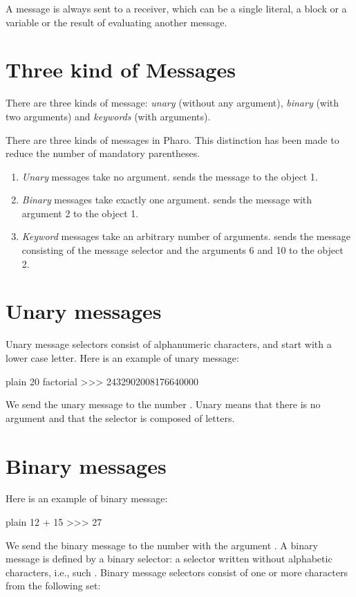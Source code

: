 \documentclass[10pt,twoside,english]{_support/latex/sbabook/sbabook}
\begin{document}
A message is always sent to a receiver, which can be a single literal, a block
or a variable or the result of evaluating another message.
\section{Three kind of Messages}
There are three kinds of message: \textit{unary} (without any argument), \textit{binary} (with two arguments) and \textit{keywords} (with arguments).

There are three kinds of messages in Pharo. This distinction has been made to reduce the number of mandatory parentheses.

\begin{enumerate}
\item \textit{Unary} messages take no argument.  sends the message  to the object 1.
\item \textit{Binary} messages take exactly one argument.  sends the message \textcode{+} with argument 2 to the object 1.
\item \textit{Keyword} messages take an arbitrary number of arguments.  sends the message consisting of the message selector  and the arguments 6 and 10 to the object 2.
\end{enumerate}
\section{Unary messages}
Unary message selectors consist of alphanumeric characters, and start with a lower case letter.
Here is an example of unary message:

\begin{displaycode}{plain}
20 factorial 
>>> 2432902008176640000
\end{displaycode}

We send the unary message  to the number . Unary means that there is no argument and that the selector is 
composed of letters. 
\section{Binary messages}
Here is an example of binary message:

\begin{displaycode}{plain}
12 + 15 
>>> 27
\end{displaycode}

We send the binary message \textcode{+} to the number  with the argument . 
A binary message is defined by a binary selector: a selector written without alphabetic characters, i.e., such \textcode{+-/*=\textasciitilde{} \textless{} \textgreater{}}.
Binary message selectors consist of one or more characters from the following set:
\end{document}
